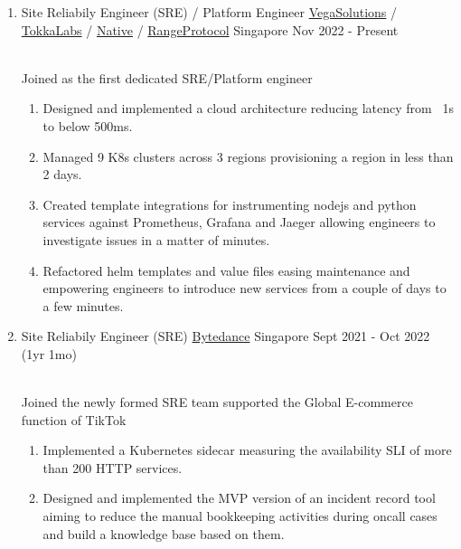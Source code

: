 \documentclass{CVSoftwareEngineer}
\begin{document}
	\begin{enumerate}[labelwidth=!, labelindent=0pt, leftmargin=*, rightmargin=15pt]

		\item[] \cvExperience
			{Site Reliabily Engineer (SRE) / Platform Engineer}
			{\href{https://vegasolutions.co}{VegaSolutions} / \href{https://tokkalabs.com}{TokkaLabs} / \href{https://native.org/}{Native} / \href{https://www.rangeprotocol.com/}{RangeProtocol}}
			{Singapore}
			{Nov 2022 - Present}
			{
				\\ Joined as the first dedicated SRE/Platform engineer
				\begin{enumerate}[labelwidth=!, labelindent=0pt, nosep, leftmargin=*]
					\item[\textasteriskcentered] Designed and implemented a cloud architecture reducing
						latency from ~1s to below 500ms.
					\item[\textasteriskcentered] Managed 9 K8s clusters across 3 regions provisioning a region in less than 2 days.
					\item[\textasteriskcentered] Created template integrations for instrumenting nodejs and python services
						against Prometheus, Grafana and Jaeger allowing engineers to investigate issues in a matter of minutes.
					\item[\textasteriskcentered] Refactored helm templates and value files easing maintenance and empowering
						engineers to introduce new services from a couple of days to a few minutes.
				\end{enumerate}
			}

		\item[] \cvExperience
			{Site Reliabily Engineer (SRE)}
			{\href{https://www.bytedance.com/en}{Bytedance}}
			{Singapore}
			{Sept 2021 - Oct 2022 (1yr 1mo)}
			{
				\\ Joined the newly formed SRE team supported the Global E-commerce function of TikTok
				\begin{enumerate}[labelwidth=!, labelindent=0pt, nosep, leftmargin=*]
					\item[\textasteriskcentered] Implemented a Kubernetes sidecar measuring the availability SLI of more than 200 HTTP services.
					\item[\textasteriskcentered] Designed and implemented the MVP version of an incident record tool aiming to reduce the manual bookkeeping activities during oncall cases and build a knowledge base based on them.
				\end{enumerate}
			}


\end{enumerate}
\end{document}
